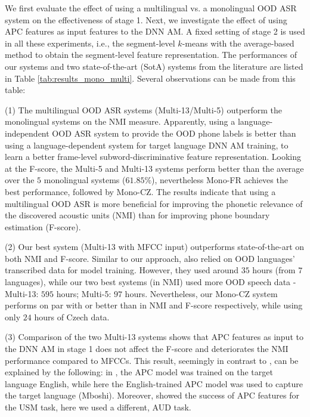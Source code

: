 \documentclass[a4paper]{article}
\begin{document}
We first evaluate the effect of using a multilingual vs. a monolingual OOD ASR system on the effectiveness of stage 1. Next, we investigate the effect of using APC features as input features to the DNN AM. A fixed setting  of stage 2 is used in all these experiments, i.e., the segment-level $k$-means with the average-based method to obtain the segment-level feature representation. The performances of our systems and two state-of-the-art (SotA) systems from the literature \cite{Yusuf2020hierarchical,Ondel2019Bayesian} are listed in Table \ref{tab:results_mono_multi}. Several observations can be made from this table:

(1) The multilingual OOD ASR systems (Multi-13/Multi-5) outperform the monolingual systems on the NMI measure. Apparently, using a language-independent OOD ASR system to provide the OOD phone labels is better than using a language-dependent system for target language DNN AM training, to learn a better frame-level subword-discriminative feature representation. Looking at the F-score, the Multi-5 and Multi-13 systems perform   better than the average over the $5$ monolingual systems ($61.85\%$), nevertheless Mono-FR achieves the best performance, followed by Mono-CZ.  
The results indicate that using a multilingual OOD ASR  is more beneficial for improving the phonetic relevance of the discovered acoustic units (NMI) than for improving phone boundary estimation (F-score).  

(2) Our best system (Multi-13 with MFCC input) outperforms state-of-the-art \cite{Yusuf2020hierarchical,Ondel2019Bayesian} on both NMI and F-score.  Similar to our approach,    \cite{Yusuf2020hierarchical,Ondel2019Bayesian} also relied on OOD languages' transcribed data for model training. However, they used around
$35$ hours (from $7$ languages), while our two best systems (in NMI) used more OOD speech data - Multi-13: $595$ hours; Multi-5: $97$ hours. Nevertheless, our  Mono-CZ system performs on par with or better than \cite{Yusuf2020hierarchical,Ondel2019Bayesian} in NMI and F-score respectively, while using only $24$ hours of Czech data.

(3) Comparison of the two Multi-13 systems shows that  APC features as input to the DNN AM in stage 1 does not affect the F-score and deteriorates the NMI performance compared to MFCCs. This result, seemingly in contrast to \cite{feng2020unsupervised}, can be explained by the following:
in \cite{feng2020unsupervised}, the APC model was trained on the target language English, while here the English-trained APC model was used to capture the target language (Mboshi). Moreover, \cite{feng2020unsupervised} showed the success of APC features for the USM task, here we used a different, AUD task.
\end{document}
